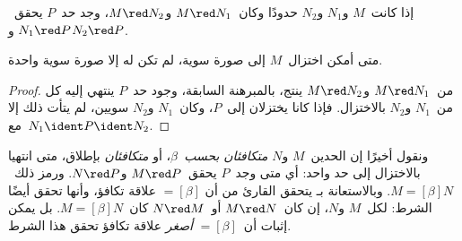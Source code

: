 \documentclass[../../../include/open-logic-section]{subfiles}
\begin{document}

\begin{thm}
إذا كانت~$M$ و$N_1$ و$N_2$ حدودًا وكان~$M \red N_1$ و$M \red N_2$،
وجد حد~$P$ يحقق~$N_1 \red P$ و$N_2 \red P$.
\end{thm}

\begin{cor}
متى أمكن اختزال~$M$ إلى صورة سوية، لم تكن له إلا صورة سوية واحدة.
\end{cor}

\begin{proof}
من~$M \red N_1$ و$M \red N_2$ ينتج، بالمبرهنة السابقة،
وجود حد~$P$ ينتهي إليه كل من~$N_1$ و$N_2$ بالاختزال.
فإذا كانا يختزلان إلى~$P$، وكان~$N_1$ و$N_2$ سويين،
لم يتأت ذلك إلا مع~$N_1 \ident P \ident N_2$.
\end{proof}

ونقول أخيرًا إن الحدين~$M$ و$N$ \emph{متكافئان بحسب~$\beta$}،
أو \emph{متكافئان} بإطلاق، متى انتهيا بالاختزال إلى حد واحد:
أي متى وجد~$P$ يحقق~$M \red P$ و$N \red P$.
ورمز ذلك~$M \equal[\beta] N$.
وبالاستعانة بـ يتحقق القارئ من أن
$\equal[\beta]$ علاقة تكافؤ، وأنها تحقق أيضًا الشرط:
لكل~$M$ و$N$، إن كان~$M \red N$ أو~$N \red M$
كان~$M \equal[\beta] N$.
بل يمكن إثبات أن~$\equal[\beta]$ \emph{أصغر} علاقة تكافؤ
تحقق هذا الشرط.
\end{document}
